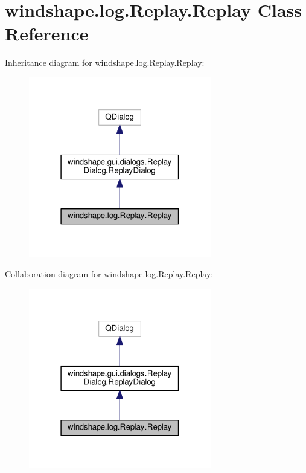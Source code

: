 \hypertarget{classwindshape_1_1log_1_1_replay_1_1_replay}{}\section{windshape.\+log.\+Replay.\+Replay Class Reference}
\label{classwindshape_1_1log_1_1_replay_1_1_replay}


Inheritance diagram for windshape.\+log.\+Replay.\+Replay\+:\nopagebreak
\begin{figure}[H]
\begin{center}
\leavevmode
\includegraphics[width=226pt]{classwindshape_1_1log_1_1_replay_1_1_replay__inherit__graph}
\end{center}
\end{figure}


Collaboration diagram for windshape.\+log.\+Replay.\+Replay\+:\nopagebreak
\begin{figure}[H]
\begin{center}
\leavevmode
\includegraphics[width=226pt]{classwindshape_1_1log_1_1_replay_1_1_replay__coll__graph}
\end{center}
\end{figure}
